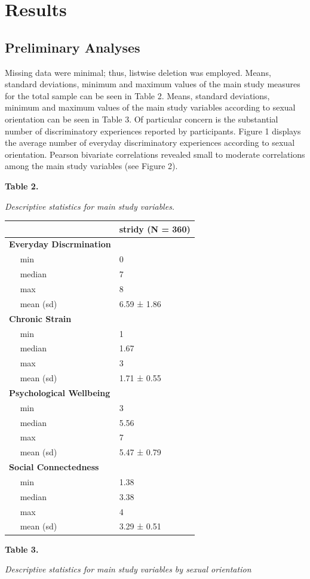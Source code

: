 \documentclass[
  english,
  man,floatsintext]{apa6}
\begin{document}
\hypertarget{results}{%
\section{Results}\label{results}}

\hypertarget{preliminary-analyses}{%
\subsection{Preliminary Analyses}\label{preliminary-analyses}}

Missing data were minimal; thus, listwise deletion was employed. Means, standard deviations, minimum and maximum values of the main study measures for the total sample can be seen in Table 2. Means, standard deviations, minimum and maximum values of the main study variables according to sexual orientation can be seen in Table 3. Of particular concern is the substantial number of discriminatory experiences reported by participants. Figure 1 displays the average number of everyday discriminatory experiences according to sexual orientation. Pearson bivariate correlations revealed small to moderate correlations among the main study variables (see Figure 2).

\newpage
\textbf{Table 2.}

\emph{Descriptive statistics for main study variables.}

\begin{longtable}[]{@{}ll@{}}
\toprule
& stridy (N = 360)\tabularnewline
\midrule
\endhead
\textbf{Everyday Discrmination} & ~~\tabularnewline
~~ min & 0\tabularnewline
~~ median & 7\tabularnewline
~~ max & 8\tabularnewline
~~ mean (sd) & 6.59 ± 1.86\tabularnewline
\textbf{Chronic Strain} & ~~\tabularnewline
~~ min & 1\tabularnewline
~~ median & 1.67\tabularnewline
~~ max & 3\tabularnewline
~~ mean (sd) & 1.71 ± 0.55\tabularnewline
\textbf{Psychological Wellbeing} & ~~\tabularnewline
~~ min & 3\tabularnewline
~~ median & 5.56\tabularnewline
~~ max & 7\tabularnewline
~~ mean (sd) & 5.47 ± 0.79\tabularnewline
\textbf{Social Connectedness} & ~~\tabularnewline
~~ min & 1.38\tabularnewline
~~ median & 3.38\tabularnewline
~~ max & 4\tabularnewline
~~ mean (sd) & 3.29 ± 0.51\tabularnewline
\bottomrule
\end{longtable}

\newpage

\textbf{Table 3.}

\emph{Descriptive statistics for main study variables by sexual orientation}
\end{document}
